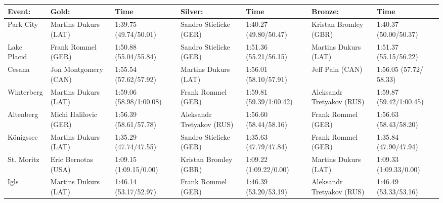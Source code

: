 \documentclass{article}
\begin{document}
\begin{tabular}{lllllll}
\toprule
Event: & Gold: & Time & Silver: & Time & Bronze: & Time \\
\midrule
Park City & Martins Dukurs (LAT) & 1:39.75 (49.74/50.01) & Sandro Stielicke (GER) & 1:40.27 (49.80/50.47) & Kristan Bromley (GBR) & 1:40.37 (50.00/50.37) \\
Lake Placid & Frank Rommel (GER) & 1:50.88 (55.04/55.84) & Sandro Stielicke (GER) & 1:51.36 (55.21/56.15) & Martins Dukurs (LAT) & 1:51.37 (55.15/56.22) \\
Cesana & Jon Montgomery (CAN) & 1:55.54 (57.62/57.92) & Martins Dukurs (LAT) & 1:56.01 (58.10/57.91) & Jeff Pain (CAN) & 1:56.05 (57.72/ 58.33) \\
Winterberg & Martins Dukurs (LAT) & 1:59.06 (58.98/1:00.08) & Frank Rommel (GER) & 1:59.81 (59.39/1:00.42) & Aleksandr Tretyakov (RUS) & 1:59.87 (59.42/1:00.45) \\
Altenberg & Michi Halilovic (GER) & 1:56.39 (58.61/57.78) & Aleksandr Tretyakov (RUS) & 1:56.60 (58.44/58.16) & Frank Rommel (GER) & 1:56.63 (58.43/58.20) \\
Königssee & Martins Dukurs (LAT) & 1:35.29 (47.74/47.55) & Sandro Stielicke (GER) & 1:35.63 (47.79/47.84) & Frank Rommel (GER) & 1:35.84 (47.90/47.94) \\
St. Moritz & Eric Bernotas (USA) & 1:09.15 (1:09.15/0.00) & Kristan Bromley (GBR) & 1:09.22 (1:09.22/0.00) & Martins Dukurs (LAT) & 1:09.33 (1:09.33/0.00) \\
Igls & Martins Dukurs (LAT) & 1:46.14 (53.17/52.97) & Frank Rommel (GER) & 1:46.39 (53.20/53.19) & Aleksandr Tretyakov (RUS) & 1:46.49 (53.33/53.16) \\
\bottomrule
\end{tabular}
\end{document}
